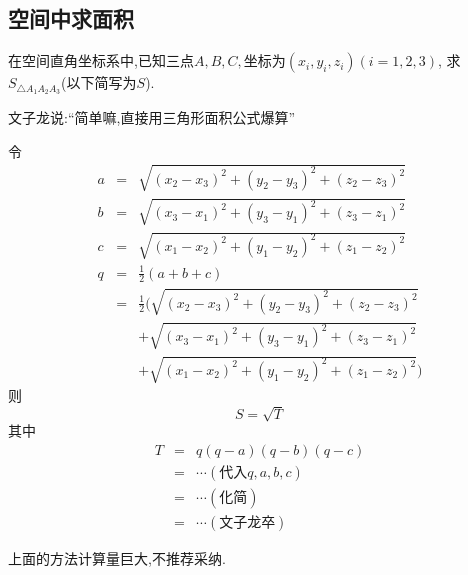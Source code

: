 \subsection{空间中求面积}

\prob 在空间直角坐标系中,已知三点$A,B,C,
\textrm{坐标为}(x_i,y_i,z_i)(i=1,2,3)$,
求$S_{\triangle A_1A_2A_3}$(以下简写为$S$).

文子龙说:``简单嘛,直接用三角形面积公式爆算''

\newcommand{\aaa}{\sqrt{(x_2-x_3)^2+(y_2-y_3)^2+(z_2-z_3)^2}}
\newcommand{\bbb}{\sqrt{(x_3-x_1)^2+(y_3-y_1)^2+(z_3-z_1)^2}}
\newcommand{\ccc}{\sqrt{(x_1-x_2)^2+(y_1-y_2)^2+(z_1-z_2)^2}}
\newcommand{\qqq}{q}

\sol
% 
令
\begin{eqnarray}
a&=&\aaa \nonumber\\
b&=&\bbb \nonumber\\
c&=&\ccc \nonumber\\
q&=&\frac{1}{2}(a+b+c) \nonumber\\
 &=& \frac{1}{2}(\aaa \nonumber\\
 && +\bbb \nonumber\\
 && +\ccc \nonumber)
\end{eqnarray}
则$$S=\sqrt{T}$$
其中
\begin{eqnarray}
  T&=&q(q-a)(q-b)(q-c) \nonumber \\  
  &=&\cdots(\textrm{代入}q,a,b,c) \nonumber \\
  &=&\cdots(\textrm{化简}) \nonumber \\
  &=&\cdots(\textrm{文子龙卒}) \nonumber 
\end{eqnarray}
\solend

上面的方法计算量巨大,不推荐采纳.

